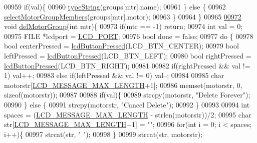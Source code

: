 \begin{DoxyCode}
{{{{{{{{{{{{{{00959     \textcolor{keywordflow}{if}(val)\{
00960         \hyperlink{lcddiag_8c_a17fe3ffc769a6d02c5226b3bfb79f28f}{typeString}(groups[mtr].name);
00961     \} \textcolor{keywordflow}{else} \{
00962         \hyperlink{lcddiag_8c_a72f3f96c95c24f67103b2eb30995dccb}{selectMotorGroupMembers}(groups[mtr].motor);
00963     \}
00964 \}
00965 
\hypertarget{lcddiag_8c_source.tex_l00972}{}\hyperlink{lcddiag_8c_ac1782b34157c340fc8ae576a55d7d067}{00972} \textcolor{keywordtype}{void} \hyperlink{lcddiag_8c_ac1782b34157c340fc8ae576a55d7d067}{delMotorGroup}(\textcolor{keywordtype}{int} mtr)\{
00973     \textcolor{keywordflow}{if}(mtr == -1) \textcolor{keywordflow}{return};
00974     \textcolor{keywordtype}{int} val = 0;
00975     FILE *lcdport = \hyperlink{lcdmsg_8h_abcf42bd88b3c36193f301ca25b033875}{LCD\_PORT};
00976     \textcolor{keywordtype}{bool} done = \textcolor{keyword}{false};
00977     \textcolor{keywordflow}{do} \{
00978         \textcolor{keywordtype}{bool} centerPressed = \hyperlink{lcddiag_8h_a74e4c744db49f9b7b645095575e152ad}{lcdButtonPressed}(LCD\_BTN\_CENTER);
00979         \textcolor{keywordtype}{bool} leftPressed = \hyperlink{lcddiag_8h_a74e4c744db49f9b7b645095575e152ad}{lcdButtonPressed}(LCD\_BTN\_LEFT);
00980         \textcolor{keywordtype}{bool} rightPressed = \hyperlink{lcddiag_8h_a74e4c744db49f9b7b645095575e152ad}{lcdButtonPressed}(LCD\_BTN\_RIGHT);
00981 
00982         \textcolor{keywordflow}{if}(rightPressed && val != 1) val++;
00983         \textcolor{keywordflow}{else} \textcolor{keywordflow}{if}(leftPressed && val != 0) val--;
00984 
00985         \textcolor{keywordtype}{char} motorstr[\hyperlink{lcdmsg_8h_abe4c4b70fc6f44ae3680e5b2c68cdd00}{LCD\_MESSAGE\_MAX\_LENGTH}+1];
00986         memset(motorstr, 0, \textcolor{keyword}{sizeof}(motorstr));
00987 
00988         \textcolor{keywordflow}{if}(val)\{
00989             strcpy(motorstr, \textcolor{stringliteral}{"Delete Forever"});
00990         \} \textcolor{keywordflow}{else} \{
00991             strcpy(motorstr, \textcolor{stringliteral}{"Cancel Delete"});
00992         \}
00993 
00994         \textcolor{keywordtype}{int} spaces = (\hyperlink{lcdmsg_8h_abe4c4b70fc6f44ae3680e5b2c68cdd00}{LCD\_MESSAGE\_MAX\_LENGTH} - strlen(motorstr))/2;
00995         \textcolor{keywordtype}{char} str[\hyperlink{lcdmsg_8h_abe4c4b70fc6f44ae3680e5b2c68cdd00}{LCD\_MESSAGE\_MAX\_LENGTH}+1] = \textcolor{stringliteral}{""};
00996         \textcolor{keywordflow}{for}(\textcolor{keywordtype}{int} i = 0; i < spaces; i++)\{
00997             strcat(str, \textcolor{stringliteral}{" "});
00998         \}
00999         strcat(str, motorstr);
}}}}}}}}}}}}}}
\end{DoxyCode}
